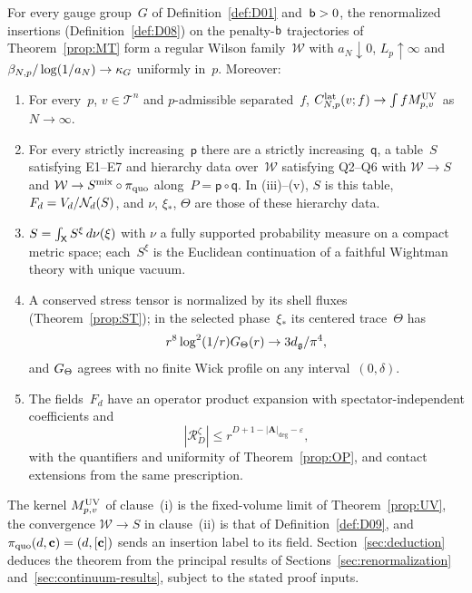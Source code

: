 \setcounter{maintheorem}{1}
\begin{maintheorem}\label{thm:B}
For every gauge group~$G$ of Definition~\ref{def:D01} and~$\mathsf{b}>0$, the renormalized insertions (Definition~\ref{def:D08}) on the penalty-$\mathsf{b}$ trajectories of Theorem~\ref{prop:MT} form a regular Wilson family~$\mathcal W$ with $a_N\downarrow0$, $L_p\uparrow\infty$ and $\beta_{N,p}/\log(1/a_N)\to\kappa_G$ uniformly in~$p$. Moreover:
\begin{enumerate}[label=\textup{(\roman*)},ref=\roman*]
\item\label{it:B1} For every~$p$, $v\in\mathcal T^n$ and $p$-admissible separated~$f$, $C^{\mathrm{lat}}_{N,p}(v;f)\to\int fM^{\rm UV}_{p,v}$ as $N\to\infty$.
\item\label{it:B2} For every strictly increasing~$\mathsf p$ there are a strictly increasing~$\mathsf q$, a table~$S$ satisfying E1--E7 and hierarchy data over~$\mathcal W$ satisfying Q2--Q6 with $\mathcal W\to S$ and $\mathcal W\to S^{\rm mix}\circ\pi_{\rm quo}$ along~$P=\mathsf p\circ\mathsf q$. In (iii)--(v), $S$ is this table, $F_d=V_d/\mathcal{N}_{d}(S)$, and $\nu$, $\xi_*$, $\Theta$ are those of these hierarchy data.
\item\label{it:B3} $S=\int_{\mathsf{X}}S^\xi\,d\nu(\xi)$ with $\nu$ a fully supported probability measure on a compact metric space; each~$S^\xi$ is the Euclidean continuation of a faithful Wightman theory with unique vacuum.
\item\label{it:B4} A conserved stress tensor is normalized by its shell fluxes (Theorem~\ref{prop:ST}); in the selected phase~$\xi_*$ its centered trace~$\Theta$ has
\begin{equation*}
r^8\log^2(1/r)G_{\Theta}(r)\to3d_{\mathfrak{g}}/\pi^4,
\end{equation*}
and $G_{\Theta}$ agrees with no finite Wick profile on any interval~$(0,\delta)$.
\item\label{it:B5} The fields~$F_d$ have an operator product expansion with spectator-independent coefficients and
\begin{equation*}
|\mathcal R_D^\zeta|\le r^{D+1-|\boldsymbol A|_{\deg}-\varepsilon},
\end{equation*}
with the quantifiers and uniformity of Theorem~\ref{prop:OP}, and contact extensions from the same prescription.
\end{enumerate}
\end{maintheorem}

The kernel $M^{\rm UV}_{p,v}$ of clause~(i) is the fixed-volume limit of Theorem~\ref{prop:UV}, the convergence $\mathcal W\to S$ in clause~(ii) is that of Definition~\ref{def:D09}, and $\pi_{\rm quo}(d,\mathbf c)=(d,[\mathbf c])$ sends an insertion label to its field. Section~\ref{sec:deduction} deduces the theorem from the principal results of Sections~\ref{sec:renormalization} and~\ref{sec:continuum-results}, subject to the stated proof inputs.

